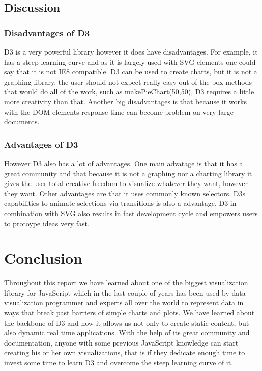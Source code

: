 \documentclass{bioinfo}
\begin{document}
\subsection{Discussion}
\subsubsection{Disadvantages of D3}
\hfill \break
D3 is a very powerful library however it does have disadvantages. For example, it has a steep learning curve and as it is largely used with SVG elements one could say that it is not IE8 compatible.
D3 can be used to create charts, but it is not a graphing library, the user should not expect really easy out of the box methods that would do all of the work, such as makePieChart(50,50), D3 requires a little more creativity than that. Another big disadvantages is that because it works with the DOM elements response time can become problem on very large documents.

\subsubsection{Advantages of D3}
\hfill \break
However D3 also has a lot of advantages. One main advatage is that it has a great community and that because it is not a graphing nor a charting library it gives the user total creative freedom to visualize whatever they want, however they want. Other advantages are that it uses commonly known selectors.
D3s capabilities to animate selections via transitions is also a advantage.
D3 in combination with SVG also results in fast development cycle and empowers users to protoype ideas very fast.


\section{Conclusion}
Throughout this report we have learned about one of the biggest visualization library for JavaScript which in the last couple of years has been used by data visualization programmer and experts all over the world to represent data in ways that break past barriers of simple charts and plots.
We have learned about the backbone of D3 and how it allows us not only to create static content, but also dynamic real time applications. With the help of its great community and documentation, anyone with some previous JavaScript knowledge can start creating his or her own visualizations, that is if they dedicate enough time to invest some time to learn D3 and overcome the steep learning curve of it.
\end{document}
